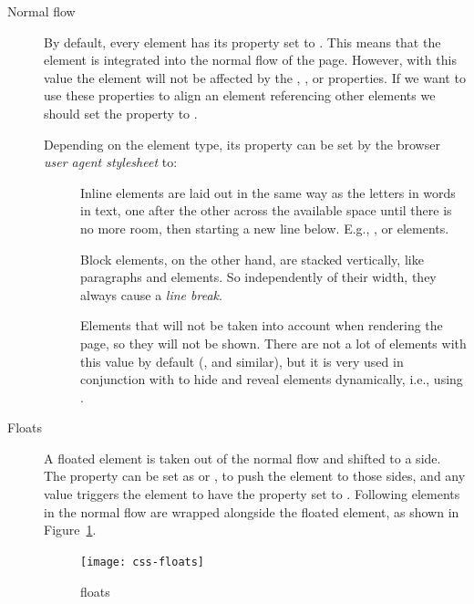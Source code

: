 \begin{description}
  \item[Normal flow] By default, every element has its  property set to .
  This means that the element is integrated into the normal flow of the page.
  However, with this value the element will not be affected by the , ,  or  properties.
  If we want to use these properties to align an element referencing other elements we should set the  property to .
  
  Depending on the element type, its  property can be set by the browser \emph{user agent stylesheet} to:
  \begin{description}
      \item[] Inline elements are laid out in the same way as the letters in words in text, one after the other across the available space until there is no more room, then starting a new line below. E.g., ,  or  elements.
    \item[] Block elements, on the other hand, are stacked vertically, like paragraphs and  elements.
    So independently of their width, they always cause a \emph{line break}.
    \item[] Elements that will not be taken into account when rendering the page, so they will not be shown.
    There are not a lot of elements with this value by default (,  and similar), but it is very used in conjunction with  to hide and reveal elements dynamically, i.e., using .
  \end{description}
  \item[Floats] A floated element is taken out of the normal flow and shifted to a side.
  The property  can be set as  or , to push the element to those sides, and any value triggers the element to have the  property set to .
  Following elements in the normal flow are wrapped alongside the floated element, as shown in Figure~\ref{fig:css-floats}.
  \begin{figure}[htbp]
    \centering
      \texttt{[image: css-floats]}
    \caption{ floats}
    \label{fig:css-floats}
  \end{figure}
  

\end{description}
